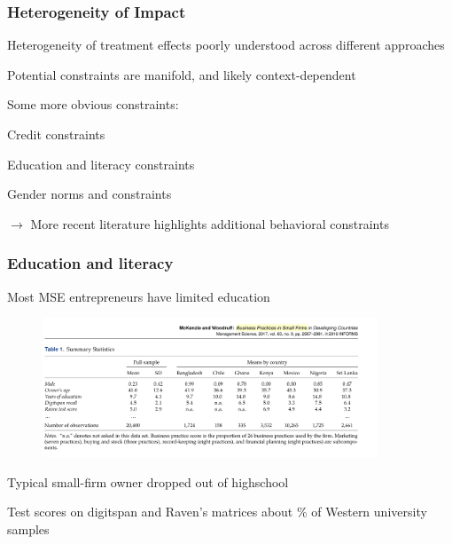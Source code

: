 \documentclass[hideothersubsections, usenames,dvipsnames,11pt]{beamer}
\newenvironment{itemize_2pt}{\itemize\addtolength{\itemsep}{2pt}}{\enditemize}
\begin{document}
\begin{frame}
\frametitle{Heterogeneity of Impact}

Heterogeneity of treatment effects poorly understood across different approaches
\begin{itemize_2pt}
	\item Potential constraints are manifold, and likely context-dependent
	
\vspace{0.5em}	
	
	\item Some more obvious constraints:
	\begin{itemize_2pt}
		\item \textcolor{bdf}{Credit constraints} \citep[e.g.,][]{Berge2015, Gine2021}%
		\item \textcolor{bdf}{Education} and \textcolor{bdf}{literacy constraints}
		\item \textcolor{bdf}{Gender norms and constraints}
	\end{itemize_2pt} 
	
	\vspace{1.0em}

	$\rightarrow$ More recent literature highlights additional \textcolor{bdf}{behavioral constraints}	
	
\end{itemize_2pt}
	

\end{frame}

\begin{frame}
\frametitle{Education and literacy}

Most MSE entrepreneurs have limited education

\vspace{-1.9em}

\begin{figure}[htbp]
	\centering
	\includegraphics[width=27em]{pics/McK2017_educ.png}
	\label{McKenzie(2017): Education and cognitive functioning}
\end{figure}

\vspace{-2.5em}

\begin{itemize_2pt}
	\item Typical small-firm owner dropped out of highschool
	\item Test scores on digitspan and Raven's matrices about \% of Western university samples \textcolor{red}{\citep[comp.][]{}}
\end{itemize_2pt}
\end{frame}
\end{document}

